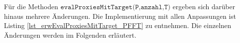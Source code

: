 \documentclass[a4paper,12pt]{article}
\begin{document}

Für die Methoden $\texttt{evalProxiesMitTarget(P,anzahl,T)}$ ergeben sich darüber hinaus mehrere Änderungen. Die Implementierung mit allen Anpassungen ist Listing \ref{lst_erwEvalProxiesMitTarget_PFFT} zu entnehmen. Die einzelnen Änderungen werden im Folgenden erläutert.
\end{document}
